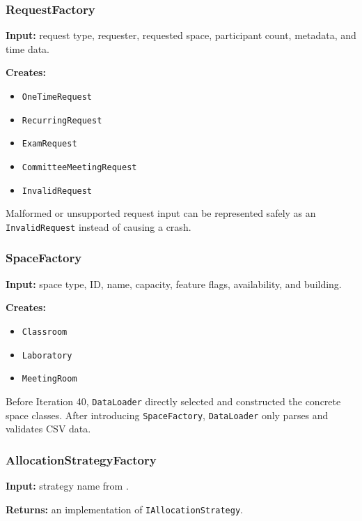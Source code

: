 \documentclass[12pt,a4paper]{article}
\begin{document}
\subsubsection*{RequestFactory}

\textbf{Input:} request type, requester, requested space, participant count,
metadata, and time data.

\textbf{Creates:}

\begin{itemize}
    \item \texttt{OneTimeRequest}
    \item \texttt{RecurringRequest}
    \item \texttt{ExamRequest}
    \item \texttt{CommitteeMeetingRequest}
    \item \texttt{InvalidRequest}
\end{itemize}

Malformed or unsupported request input can be represented safely as an
\texttt{InvalidRequest} instead of causing a crash.

\subsubsection*{SpaceFactory}

\textbf{Input:} space type, ID, name, capacity, feature flags, availability,
and building.

\textbf{Creates:}

\begin{itemize}
    \item \texttt{Classroom}
    \item \texttt{Laboratory}
    \item \texttt{MeetingRoom}
\end{itemize}

Before Iteration 40, \texttt{DataLoader} directly selected and constructed the
concrete space classes. After introducing \texttt{SpaceFactory},
\texttt{DataLoader} only parses and validates CSV data.

\subsubsection*{AllocationStrategyFactory}

\textbf{Input:} strategy name from .

\textbf{Returns:} an implementation of \texttt{IAllocationStrategy}.
\end{document}
